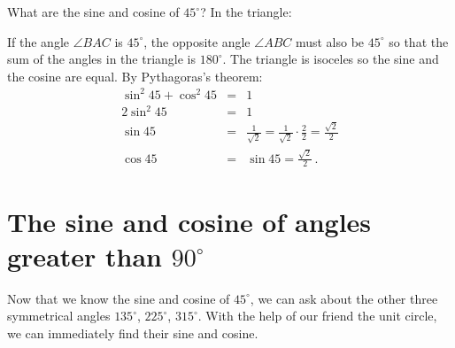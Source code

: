 \documentclass[11pt,a4paper]{article}
\begin{document}
What are the sine and cosine of $45^\circ$? In the triangle:
\begin{center}
\end{center}
If the angle $\angle BAC$ is $45^\circ$, the opposite angle $\angle ABC$ must also be $45^\circ$ so that the sum of the angles in the triangle is $180^\circ$. The triangle is isoceles so the sine and the cosine are equal. By Pythagoras's theorem:
\begin{eqnarray*}
\sin^2 45 + \cos^2 45 &=& 1\\
2\sin^2 45 &=& 1\\
\sin 45 &=& \frac{1}{\sqrt{2}} = \frac{1}{\sqrt{2}}\cdot \frac{2}{2} =\frac{\sqrt{2}}{2}\\
\cos 45 &=& \sin 45 = \frac{\sqrt{2}}{2}\,.
\end{eqnarray*}


\section{The sine and cosine of angles greater than $90^\circ$}

Now that we know the sine and cosine of $45^\circ$, we can ask about the other three symmetrical angles $135^\circ$, $225^\circ$, $315^\circ$. With the help of our friend the unit circle, we can immediately find their sine and cosine.
\end{document}

